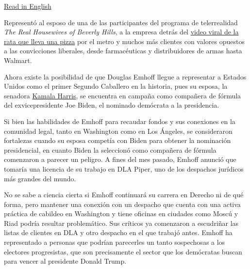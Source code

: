 \href{https://www.nytimes3xbfgragh.onion/2020/09/08/us/politics/doug-emhoff-kamala-harris-law.html}{Read
in English}

Representó al esposo de una de las participantes del programa de
telerrealidad \emph{The Real Housewives of Beverly Hills}, a la empresa
detrás del
\href{https://www.nytimes3xbfgragh.onion/2015/09/23/nyregion/pizza-rat-spurs-debate-on-how-to-clean-up-new-yorks-subway-system.html}{video
viral de la rata que lleva una pizza} por el metro y muchos más clientes
con valores opuestos a las convicciones liberales, desde farmacéuticas y
distribuidores de armas hasta Walmart.

Ahora existe la posibilidad de que Douglas Emhoff llegue a representar a
Estados Unidos como el primer Segundo Caballero en la historia, pues su
esposa, la senadora
\href{https://www.nytimes3xbfgragh.onion/es/interactive/2020/09/01/espanol/estados-unidos/kamala-harris-elecciones.html?name=styln-elections-es\&region=TOP_BANNER\&block=storyline_menu_recirc\&action=click\&pgtype=Article\&impression_id=ca59b163-ed4a-11ea-bf9f-cb8e21a97d9b\&variant=show}{Kamala
Harris}, se encuentra en campaña como compañera de fórmula del
exvicepresidente Joe Biden, el nominado demócrata a la presidencia.

Si bien las habilidades de Emhoff para recaudar fondos y sus conexiones
en la comunidad legal, tanto en Washington como en Los Ángeles, se
consideraron fortalezas cuando su esposa competía con Biden para obtener
la nominación presidencial, en cuanto Biden la seleccionó como compañera
de fórmula comenzaron a parecer un peligro. A fines del mes pasado,
Emhoff anunció que tomaría una licencia de su trabajo en DLA Piper, uno
de los despachos jurídicos más grandes del mundo.

No se sabe a ciencia cierta si Emhoff continuará su carrera en Derecho
ni de qué forma, pero mantener una conexión con un despacho que cuenta
con una activa práctica de cabildeo en Washington y tiene oficinas en
ciudades como Moscú y Riad podría resultar problemático. Sus críticos ya
comenzaron a escudriñar las listas de clientes en DLA y otro despacho en
el que trabajó antes. Emhoff ha representado a personas que podrían
parecerles un tanto sospechosas a los electores progresistas, que son
precisamente el sector que los demócratas buscan para vencer al
presidente Donald Trump.

